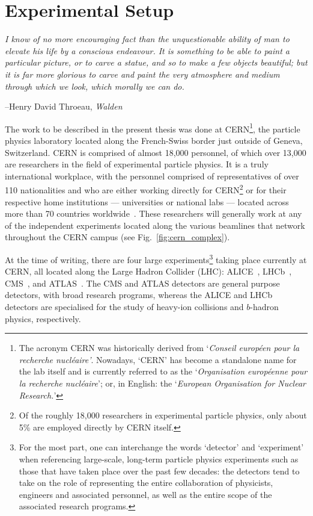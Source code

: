 \chapter{Experimental Setup}

\epigraph{\textit{I know of no more encouraging fact than the unquestionable ability
of man to elevate his life by a conscious endeavour. It is something to be able to paint a particular picture,
or to carve a statue, and so to make a few objects beautiful; but it is far more glorious to carve
and paint the very atmosphere and medium through which we look, which morally we can do.}}{--Henry David Throeau, \textit{Walden}}

The work to be described in the present thesis was done at CERN\footnote{
The acronym CERN was historically derived from `\textit{Conseil europ{\'e}en pour la recherche
nucl{\'e}aire'}. Nowadays, `CERN' has become a standalone name for the lab itself and
is currently referred to as the `\textit{Organisation europ{\'e}enne pour la recherche nucl{\'e}aire}'; or, in English: the
`\textit{European Organisation for Nuclear Research.}'}, the particle
physics laboratory located along the French-Swiss border just outside of Geneva, Switzerland.
CERN is comprised of almost 18,000 personnel, of which over 13,000 are researchers in the
field of experimental particle physics.
It is a truly international workplace, with the personnel comprised of representatives of over 110 nationalities
and who are either working directly
for CERN\footnote{Of the roughly 18,000 researchers in experimental particle physics, only about
5\% are employed directly by CERN itself.} or for their respective home institutions
--- universities or national labs ---
located across more than 70 countries worldwide~\cite{CERN-HR-STAFF-STAT-2018}.
These researchers will generally work at any of the independent experiments located along the various
beamlines that network throughout the CERN campus (see Fig.~\ref{fig:cern_complex}).

At the time of writing, there are four large experiments\footnote{For the most part, one can interchange the
words `detector' and `experiment' when referencing large-scale, long-term particle physics experiments such as those
that have taken place over the past few decades: the detectors tend to take on the role of representing
the entire collaboration of physicists, engineers and associated personnel, as well as the entire scope of the associated
research programs.} taking place currently at CERN, all located along the Large
Hadron Collider (LHC): ALICE~\cite{ALICECollab}, LHCb~\cite{LHCbCollab}, CMS~\cite{CMSCollab},
and ATLAS~\cite{ATLASCollab}. The CMS and ATLAS detectors are general purpose detectors, with broad
research programs, whereas the ALICE and LHCb detectors are specialised for the study of heavy-ion
collisions and $b$-hadron physics, respectively.


